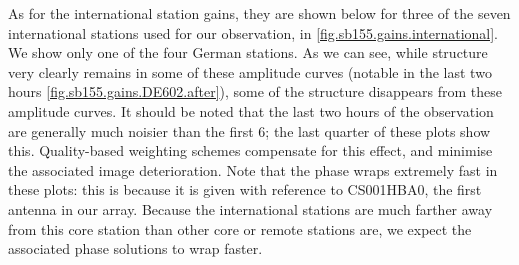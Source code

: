 \pg
As for the international station gains, they are shown below for three of the seven international stations used for our observation, in \cref{fig.sb155.gains.international}. We show only one of the four German stations. As we can see, while structure very clearly remains in some of these amplitude curves (notable in the last two hours \cref{fig.sb155.gains.DE602.after}), some of the structure disappears from these amplitude curves. It should be noted that the last two hours of the observation are generally much noisier than the first 6; the last quarter of these plots show this. Quality-based weighting schemes compensate for this effect, and minimise the associated image deterioration. Note that the phase wraps extremely fast in these plots: this is because it is given with reference to CS001HBA0, the first antenna in our array. Because the international stations are much farther away from this core station than other core or remote stations are, we expect the associated phase solutions to wrap faster.
